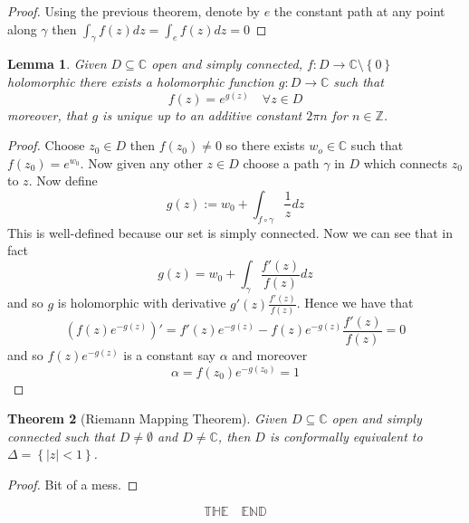 \documentclass[11pt]{article}
\newcommand{\defeq}{:=}
\newcommand{\abs}[1]{\left|#1\right|}
\newcommand{\C}{\mathbb{C}}
\newcommand{\Z}{\mathbb{Z}}
\newtheorem{theorem}{Theorem}[section]
\newtheorem{lemma}[theorem]{Lemma}
\begin{document}
\begin{proof}
Using the previous theorem, denote by $e$ the constant path at any point along $\gamma$ then
$\int_\gamma f(z)dz = \int_e f(z)dz =0$
\end{proof}

\begin{lemma}
Given $D\subseteq \C$ open and simply connected, $f:D\to\C\setminus\left\{0\right\}$ holomorphic there exists a holomorphic function $g:D\to \C$ such that
\[
	f(z)=e^{g(z)}\quad\forall z\in D
\]
moreover, that $g$ is unique up to an additive constant $2\pi n$ for $n\in \Z$.
\end{lemma}

\begin{proof}
Choose $z_0\in D$ then $f(z_0)\neq 0$ so there exists $w_o\in\C$ such that $f(z_0)=e^{w_0}$.
Now given any other $z\in D$ choose a path $\gamma$ in $D$ which connects $z_0$ to $z$.
Now define
\[
	g(z)\defeq w_0+\int_{f\circ\gamma}\frac{1}{z}dz
\]
This is well-defined because our set is simply connected.
Now we can see that in fact
\[
	g(z)=w_0+\int_\gamma\frac{f'(z)}{f(z)}dz
\]
and so $g$ is holomorphic with derivative $g'(z)\frac{f'(z)}{f(z)}$.
Hence we have that
\[
	\left(f(z)e^{-g(z)}\right)'=f'(z)e^{-g(z)}-f(z)e^{-g(z)}\frac{f'(z)}{f(z)}=0
\]
and so $f(z)e^{-g(z)}$ is a constant say $\alpha$ and moreover
\[
	\alpha=f(z_0)e^{-g(z_0)}=1
\]
\end{proof}

\begin{theorem}[Riemann Mapping Theorem]
Given $D\subseteq \C$ open and simply connected such that $D\neq\emptyset$ and $D\neq\C$, then $D$ is conformally equivalent to $\Delta=\left\{\abs{z}<1\right\}$.
\end{theorem}
\begin{proof}
Bit of a mess.
\end{proof}

\[
	\mathbb{T}\mathbb{H}\mathbb{E}\quad\mathbb{E}\mathbb{N}\mathbb{D}
\]
\end{document}
